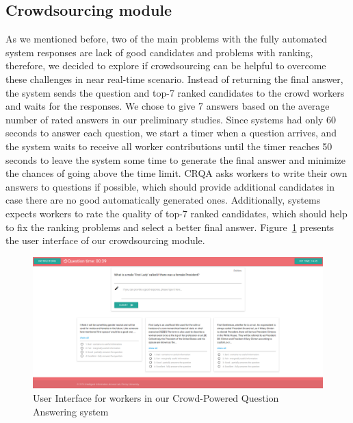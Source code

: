 \documentclass[letterpaper]{article}
\begin{document}
\subsection{Crowdsourcing module}
\label{sec:system:crowd}

As we mentioned before, two of the main problems with the fully automated system responses are lack of good candidates and problems with ranking, therefore, we decided to explore if crowdsourcing can be helpful to overcome these challenges in near real-time scenario.
Instead of returning the final answer, the system sends the question and top-7 ranked candidates to the crowd workers and waits for the responses.
We chose to give 7 answers based on the average number of rated answers in our preliminary studies.
Since systems had only 60 seconds to answer each question, we start a timer when a question arrives, and the system waits to receive all worker contributions until the timer reaches 50 seconds to leave the system some time to generate the final answer and minimize the chances of going above the time limit.
CRQA asks workers to write their own answers to questions if possible, which should provide additional candidates in case there are no good automatically generated ones.
Additionally, systems expects workers to rate the quality of top-7 ranked candidates, which should help to fix the ranking problems and select a better final answer.
Figure~\ref{fig:crowd_ui} presents the user interface of our crowdsourcing module.

\begin{figure}[h!t]
	\centering
	\includegraphics[width=\textwidth]{img/crowd_ui}
	\caption{User Interface for workers in our Crowd-Powered Question Answering system}
	\label{fig:crowd_ui}
\end{figure}
\end{document}
